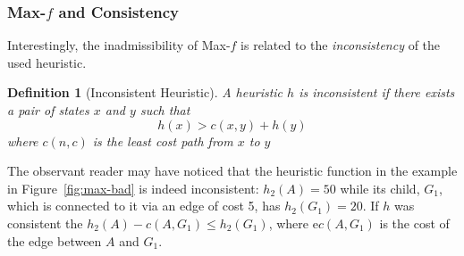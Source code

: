 \documentclass{aicom2e}
\newtheorem{definition}{Definition}
\begin{document}
 \subsubsection{Max-$f$ and Consistency}
 Interestingly, the inadmissibility of Max-$f$ is related to the {\em inconsistency} of the used heuristic. 
  \begin{definition}[Inconsistent Heuristic]
 A heuristic $h$ is inconsistent if there exists a pair of states $x$ and $y$ such that
 \[ h(x)>c(x,y)+h(y) \]
 where $c(n,c)$ is the least cost path from $x$ to $y$
 \label{def:inconsistent}
 \end{definition}
 The observant reader may have noticed that the heuristic function in the example in Figure~\ref{fig:max-bad} is indeed inconsistent: $h_2(A)=50$ while its child, $G_1$, which is connected to it via an edge of cost 5, has $h_2(G_1)=20$. If $h$ was consistent the $h_2(A)-c(A,G_1)\leq h_2(G_1)$, where e$c(A,G_1)$ is the cost of the edge between $A$ and $G_1$. 
 
\end{document}
